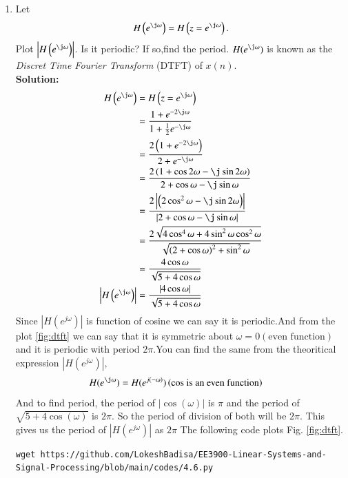 \documentclass[journal,12pt,twocolumn]{IEEEtran}
\newcommand{\solution}{\noindent \textbf{Solution: }}
\providecommand{\brak}[1]{\ensuremath{\left(#1\right)}}
\providecommand{\abs}[1]{\left\vert#1\right\vert}
\numberwithin{equation}{section}
\renewcommand\thesection{\arabic{section}}
\begin{document}
\begin{enumerate}[label=\thesection.\arabic*]
%
\item 
Let
\begin{equation}
H\brak{e^{\j \omega}} = H\brak{z = e^{\j \omega}}.
\end{equation}
Plot $\abs{H\brak{e^{\j \omega}}}$. Is it periodic? If so,find the period. $H(e^{\j \omega})$ is
known as the {\em Discret Time Fourier Transform} (DTFT) of $x(n)$.
\\
\solution 
\begin{align}
H\brak{e^{\j \omega}} &= H\brak{z = e^{\j \omega}}\\
&= \frac{1 + e^{-2 \j \omega}}{1 + \frac{1}{2} e^{-\j \omega}}\\
&= \frac{2\brak{1 + e^{-2 \j \omega}}}{2 + e^{-\j \omega}}\\
&= \frac{2\brak{1 + \cos{2 \omega}-\j \sin{2\omega}}}{2 + \cos{\omega}-\j \sin{ \omega}}\\
&= \frac{2\abs{\brak{2\cos^2 \omega-\j \sin{2\omega}}}}{\abs{2 + \cos{\omega}-\j \sin{ \omega}}}\\
&= \frac{2\sqrt{4\cos^4 \omega+4\sin^2 \omega \cos^2 \omega}}{\sqrt{\brak{2 + \cos \omega}^2+ \sin^2 \omega }}\\
&=\frac{4\cos\omega}{\sqrt{5 + 4\cos \omega}}\\
\abs{H\brak{e^{\j \omega}} }&=\frac{\abs{4\cos\omega}}{\sqrt{5 + 4\cos \omega}}
\end{align}
Since $\abs{H(e^{j\omega})}$ is function of cosine we can say it is periodic.And from the plot \ref{fig:dtft} we can say that it is symmetric about $\omega = 0\brak{\text{even function}}$ and it is periodic with period $2\pi$.You can find the same from the theoritical expression $\abs{H\brak{e^{j \omega}}}$, 
       \begin{align}
         H(e^{\j \omega}) &= H(e^{j(-\omega)})\brak{\text{cos is an even function}}
       \end{align}
    And to find period, the period of $\abs{\cos(\omega)}$ is $\pi$ and the period of $\sqrt{5 + 4\cos\brak{\omega}}$ is $2\pi$. So the period of division of both will be $2\pi$.
     This gives us the period of $\abs{H(e^{j\omega})}$ as $2\pi$
 The following code plots Fig. \ref{fig:dtft}.
\begin{lstlisting}
wget https://github.com/LokeshBadisa/EE3900-Linear-Systems-and-Signal-Processing/blob/main/codes/4.6.py
\end{lstlisting}
\begin{figure}[!ht]
\centering

\end{figure}
\end{enumerate}
\end{document}
